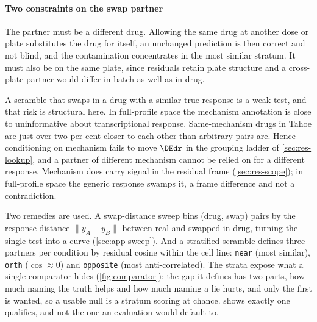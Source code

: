 

\paragraph{Two constraints on the swap partner} The partner must be a different
drug. Allowing the same drug at another dose or plate substitutes the drug for
itself, an unchanged prediction is then correct and not blind, and the contamination
concentrates in the most similar stratum. It must also be on the same plate,
since residuals retain plate structure and a cross-plate partner would differ in
batch as well as in drug.

A scramble that swaps in a drug with a similar true response is a weak test, and
that risk is structural here. In full-profile space the mechanism annotation is
close to uninformative about transcriptional response. Same-mechanism drugs in
Tahoe are just over two per cent closer to each other than arbitrary pairs
are.
Hence conditioning on mechanism fails to move $\DEdr$ in the grouping ladder of
\cref{sec:res-lookup}, and a partner of different mechanism cannot be relied on
for a different response. Mechanism does carry signal in the residual frame
(\cref{sec:res-scope}); in full-profile space the generic response swamps it, a
frame difference and not a contradiction.

Two remedies are used. A swap-distance sweep bins (drug, swap) pairs by the
response distance $\lVert y_A - y_B \rVert$ between real and swapped-in drug,
turning the single test into a curve (\cref{sec:app-sweep}). And a stratified
scramble defines three partners per condition by residual cosine within the cell
line: \texttt{near} (most similar), \texttt{orth} ($\cos\approx0$) and
\texttt{opposite} (most anti-correlated). The strata expose what a single
comparator hides (\cref{fig:comparator}): the gap it defines has two parts, how
much naming the truth helps and how much naming a lie hurts, and only the first
is wanted, so a usable null is a stratum scoring at chance.
 shows exactly one qualifies, and not the one an
evaluation would default to.

